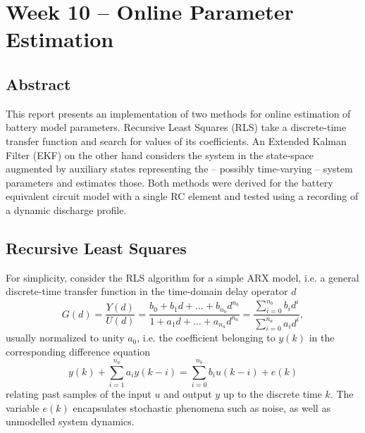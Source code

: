 \chapter{Week 10 -- Online Parameter Estimation}


\section{Abstract}
This report presents an implementation of two methods for online estimation of battery model parameters. Recursive Least Squares (RLS) take a discrete-time transfer function and search for values of its coefficients. An Extended Kalman Filter (EKF) on the other hand considers the system in the state-space augmented by auxiliary states representing the -- possibly time-varying -- system parameters and estimates those. Both methods were derived for the battery equivalent circuit model with a single RC element and tested using a recording of a dynamic discharge profile.


\section{Recursive Least Squares}
\label{sec:10-rls}

For simplicity, consider the RLS algorithm for a simple ARX model, i.e. a general discrete-time transfer function in the time-domain delay operator $d$
\begin{equation}
    G(d) = \frac{Y(d)}{U(d)} = \frac{b_0 + b_1d + \dots + b_{n_b}d^{n_b}}{1 + a_1d + \dots + a_{n_a}d^{n_a}} = \frac{\sum_{i=0}^{n_b} b_i d^i}{\sum_{i=0}^{n_a} a_i d^i},
\end{equation}
usually normalized to unity $a_0$, i.e. the coefficient belonging to $y(k)$ in the corresponding difference equation
\begin{equation}
    y(k) + \sum_{i=1}^{n_a} a_i y(k-i) = \sum_{i=0}^{n_b} b_i u(k-i) + e(k)
    \label{eq:10-difference}
\end{equation}
relating past samples of the input $u$ and output $y$ up to the discrete time $k$. The variable $e(k)$ encapsulates stochastic phenomena such as noise, as well as unmodelled system dynamics.

